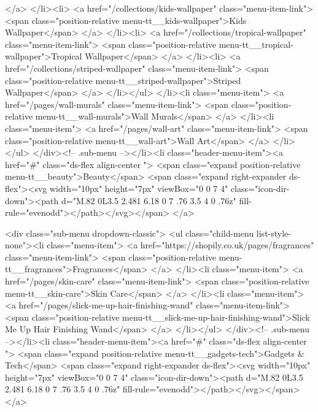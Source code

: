 {{{{{{{                        </a>
                      </li><li>
                        <a href="/collections/kids-wallpaper" class="menu-item-link">
                          <span class="position-relative menu-tt__kids-wallpaper">Kids Wallpaper</span>
                        </a>
                      </li><li>
                        <a href="/collections/tropical-wallpaper" class="menu-item-link">
                          <span class="position-relative menu-tt__tropical-wallpaper">Tropical Wallpaper</span>
                        </a>
                      </li><li>
                        <a href="/collections/striped-wallpaper" class="menu-item-link">
                          <span class="position-relative menu-tt__striped-wallpaper">Striped Wallpaper</span>
                        </a>
                      </li></ul>
                </li><li class="menu-item">
                  <a href="/pages/wall-murals" class="menu-item-link">
                    <span class="position-relative menu-tt__wall-murals">Wall Murals</span>
                  </a>
                </li><li class="menu-item">
                  <a href="/pages/wall-art" class="menu-item-link">
                    <span class="position-relative menu-tt__wall-art">Wall Art</span>
                  </a>
                </li></ul>
        </div><!-- .sub-menu --></li><li class="header-menu-item"><a href="#" class="ds-flex align-center ">
          <span class="expand position-relative menu-tt__beauty">Beauty</span>
          <span class="expand right-expander ds-flex"><svg width="10px" height="7px" viewBox="0 0 7 4" class="icon-dir-down"><path d="M.82 0L3.5 2.481 6.18 0 7 .76 3.5 4 0 .76z" fill-rule="evenodd"></path></svg></span>
        </a>

        <div class="sub-menu dropdown-classic">
          <ul class="child-menu list-style-none"><li class="menu-item">
                  <a href="https://shopily.co.uk/pages/fragrances" class="menu-item-link">
                    <span class="position-relative menu-tt__fragrances">Fragrances</span>
                  </a>
                </li><li class="menu-item">
                  <a href="/pages/skin-care" class="menu-item-link">
                    <span class="position-relative menu-tt__skin-care">Skin Care</span>
                  </a>
                </li><li class="menu-item">
                  <a href="/pages/slick-me-up-hair-finishing-wand" class="menu-item-link">
                    <span class="position-relative menu-tt__slick-me-up-hair-finishing-wand">Slick Me Up Hair Finishing Wand</span>
                  </a>
                </li></ul>
        </div><!-- .sub-menu --></li><li class="header-menu-item"><a href="#" class="ds-flex align-center ">
          <span class="expand position-relative menu-tt__gadgets-tech">Gadgets & Tech</span>
          <span class="expand right-expander ds-flex"><svg width="10px" height="7px" viewBox="0 0 7 4" class="icon-dir-down"><path d="M.82 0L3.5 2.481 6.18 0 7 .76 3.5 4 0 .76z" fill-rule="evenodd"></path></svg></span>
        </a>

}}}}}}}
